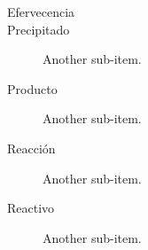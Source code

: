 \begin{defcard}
    \begin{description}
        \item[Efervecencia]
        \item[Precipitado] Another sub-item.
        \item[Producto] Another sub-item.
        \item[Reacción] Another sub-item.
        \item[Reactivo] Another sub-item.
    \end{description}
\end{defcard}